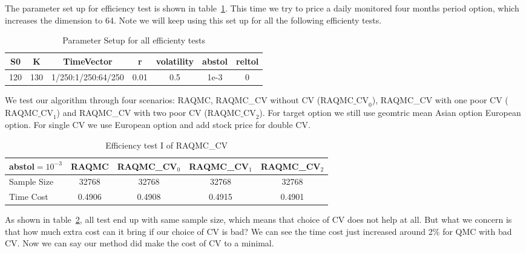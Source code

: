 The parameter set up for efficiency test is shown in table~\ref{tb:effsetup}. 
This time we try to price a daily monitored four months period option, which increases the dimension to 64. 
Note we will keep using this set up for all the following efficienty tests. 
\begin{table}[h]
    \centering
	\caption{Parameter Setup for all efficienty tests}
    \label{tb:effsetup}
	\begin{tabular}{ccccccc}
		\hline\hline
        S0 & K & TimeVector & r & volatility & abstol & reltol \\[0.5ex]
        \hline
        120  & 130 & 1/250:1/250:64/250 & 0.01 & 0.5 & 1e-3 & 0\\[1ex] 
        \hline
	\end{tabular}
\end{table}
We test our algorithm through four scenarios: RAQMC, RAQMC\_CV without CV ($\textrm{RAQMC\_CV}_0$), 
RAQMC\_CV with one poor CV ($\textrm{RAQMC\_CV}_1$) and RAQMC\_CV with two poor CV ($\textrm{RAQMC\_CV}_2$). 
For target option we still use geomtric mean Asian option European option. For single CV we use European option and add stock price for double CV. 
\begin{table}[h]
    \centering
	\caption{Efficiency test I of RAQMC\_CV}
    \label{tb:efftest1}
    \begin{tabular}{lcccc}  
    \hline\hline
    \hline
    abstol$=10^{-3}$&RAQMC&RAQMC\_CV$_0$&RAQMC\_CV$_1$& RAQMC\_CV$_2$\\[0.5ex]
    \hline
    Sample Size	&32768&32768&32768&32768\\[1ex]
    Time Cost &0.4906&0.4908 &0.4915 &0.4901\\[1ex]
   \hline
	\end{tabular}
\end{table}
As shown in table~\ref{tb:efftest1}, all test end up with same sample size, which means that choice of CV does not help at all. 
But what we concern is that how much extra cost can it bring if our choice of CV is bad? We can see the time cost just increased around 2\% for QMC with bad CV. Now we can say our method did make the cost of CV to a minimal.  

